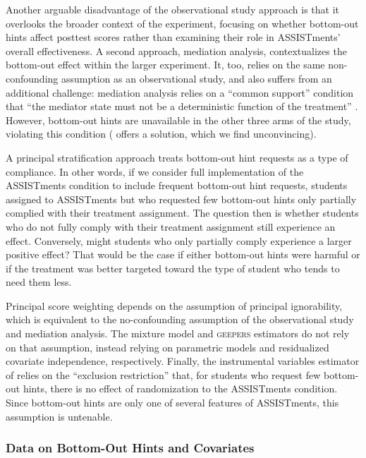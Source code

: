 \documentclass[]{article}
\begin{document}
Another arguable disadvantage of the observational study approach is that it overlooks the broader context of the experiment, focusing on whether bottom-out hints affect posttest scores rather than examining their role in ASSISTments' overall effectiveness.
A second approach, mediation analysis, contextualizes the bottom-out effect within the larger experiment.
It, too, relies on the same non-confounding assumption as an observational study, and also suffers from an additional challenge: mediation analysis relies on a ``common support'' condition that ``the mediator state must not be a deterministic function of the treatment'' \citep[p. 225]{celli2022causal}.
However, bottom-out hints are unavailable in the other three arms of the study, violating this condition (\citealt{sales2021student} offers a solution, which we find unconvincing).

A principal stratification approach treats bottom-out hint requests as a type of compliance.
In other words, if we consider full implementation of the ASSISTments condition to include frequent bottom-out hint requests, students assigned to ASSISTments but who requested few bottom-out hints only partially complied with their treatment assignment.
The question then is whether students who do not fully comply with their treatment assignment still experience an effect.
Conversely, might students who only partially comply experience a larger positive effect?
That would be the case if either bottom-out hints were harmful or if the treatment was better targeted toward the type of student who tends to need them less.

Principal score weighting depends on the assumption of principal ignorability, which is equivalent to the no-confounding assumption of the observational study and mediation analysis.
The mixture model and \textsc{geepers} estimators do not rely on that assumption, instead relying on parametric models and residualized covariate independence, respectively.
Finally, the instrumental variables estimator of \citet{air} relies on the ``exclusion restriction'' that, for students who request few bottom-out hints, there is no effect of randomization to the ASSISTments condition.
Since bottom-out hints are only one of several features of ASSISTments, this assumption is untenable. 


\subsubsection{Data on Bottom-Out Hints and Covariates}
\end{document}
